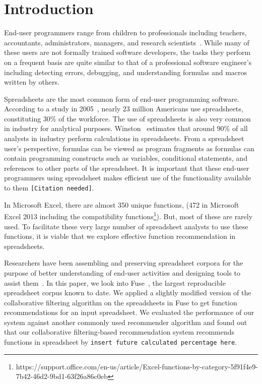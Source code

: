 \documentclass[conference]{IEEEtran}
\begin{document}
%
\IEEEpeerreviewmaketitle

\section{Introduction}

End-user programmers range from children to professionals including teachers, accountants, administrators, managers, and research scientists~\cite{ko2011state}. While many of these users are not formally trained software developers, the tasks they perform on a frequent basis are quite similar to that of a professional software engineer's including detecting errors, debugging, and understanding formulas and macros written by others.

Spreadsheets are the most common form of  end-user programming software. According to a study in 2005~\cite{scaffidi2005estimating}, nearly 23 million Americans use spreadsheets, constituting 30\% of the workforce. The use of spreadsheets is also very common in industry for analytical purposes. Winston~\cite{winston2001executive} estimates that around 90\% of all analysts in industry perform calculations in spreadsheets. From a spreadsheet user's perspective, formulas can be viewed as program fragments as formulas can contain programming constructs such as variables, conditional statements, and references to other parts of the spreadsheet. It is important that these end-user programmers using spreadsheet makes efficient use of the functionality available to them \texttt{[Citation needed]}.

In Microsoft Excel, there are almost 350 unique functions, (472 in Microsoft Excel 2013 including the compatibility functions\footnote{https://support.office.com/en-us/article/Excel-functions-by-category-5f91f4e9-7b42-46d2-9bd1-63f26a86c0eb}). But, most of these are rarely used. To facilitate these very large number of spreadsheet analysts to use these functions, it is viable that we explore effective function recommendation in spreadsheets.

Researchers have been assembling and preserving spreadsheet corpora for the purpose of better understanding of end-user activities and designing tools to assist them~\cite{fisher2005euses, hermans2014enron}. In this paper, we look into Fuse~\cite{barik2015fuse}, the largest reproducible spreadsheet corpus known to date. We applied a slightly modified version of the collaborative filtering algorithm on the spreadsheets in Fuse to get function recommendations for an input spreadsheet. We evaluated the performance of our system against another commonly used recommender algorithm and found out that our collaborative filtering-based recommendation system recommends functions in spreadsheet by \texttt{insert future calculated percentage here}. 
\end{document}
